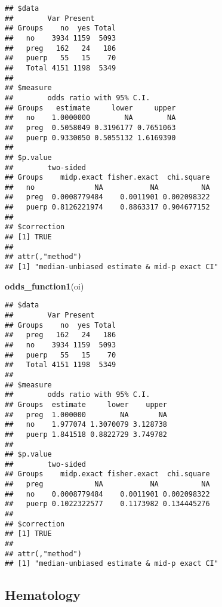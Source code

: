 \documentclass[
]{article}
\newenvironment{Shaded}{\begin{snugshade}}{\end{snugshade}}
\newcommand{\KeywordTok}[1]{\textcolor[rgb]{0.13,0.29,0.53}{\textbf{#1}}}
\newcommand{\NormalTok}[1]{#1}
\newcommand{\OperatorTok}[1]{\textcolor[rgb]{0.81,0.36,0.00}{\textbf{#1}}}
\newcommand{\StringTok}[1]{\textcolor[rgb]{0.31,0.60,0.02}{#1}}
\begin{document}
\begin{verbatim}
## $data
##        Var Present
## Groups    no  yes Total
##   no    3934 1159  5093
##   preg   162   24   186
##   puerp   55   15    70
##   Total 4151 1198  5349
## 
## $measure
##        odds ratio with 95% C.I.
## Groups   estimate     lower     upper
##   no    1.0000000        NA        NA
##   preg  0.5058049 0.3196177 0.7651063
##   puerp 0.9330050 0.5055132 1.6169390
## 
## $p.value
##        two-sided
## Groups    midp.exact fisher.exact  chi.square
##   no              NA           NA          NA
##   preg  0.0008779484    0.0011901 0.002098322
##   puerp 0.8126221974    0.8863317 0.904677152
## 
## $correction
## [1] TRUE
## 
## attr(,"method")
## [1] "median-unbiased estimate & mid-p exact CI"
\end{verbatim}

\begin{Shaded}
\begin{Highlighting}[]
\KeywordTok{odds_function1}\NormalTok{(oi)}
\end{Highlighting}
\end{Shaded}

\begin{verbatim}
## $data
##        Var Present
## Groups    no  yes Total
##   preg   162   24   186
##   no    3934 1159  5093
##   puerp   55   15    70
##   Total 4151 1198  5349
## 
## $measure
##        odds ratio with 95% C.I.
## Groups  estimate     lower    upper
##   preg  1.000000        NA       NA
##   no    1.977074 1.3070079 3.128738
##   puerp 1.841518 0.8822729 3.749782
## 
## $p.value
##        two-sided
## Groups    midp.exact fisher.exact  chi.square
##   preg            NA           NA          NA
##   no    0.0008779484    0.0011901 0.002098322
##   puerp 0.1022322577    0.1173982 0.134445276
## 
## $correction
## [1] TRUE
## 
## attr(,"method")
## [1] "median-unbiased estimate & mid-p exact CI"
\end{verbatim}

\hypertarget{hematology}{%
\subsection{Hematology}\label{hematology}}

\begin{Shaded}
\end{Shaded}
\end{document}
